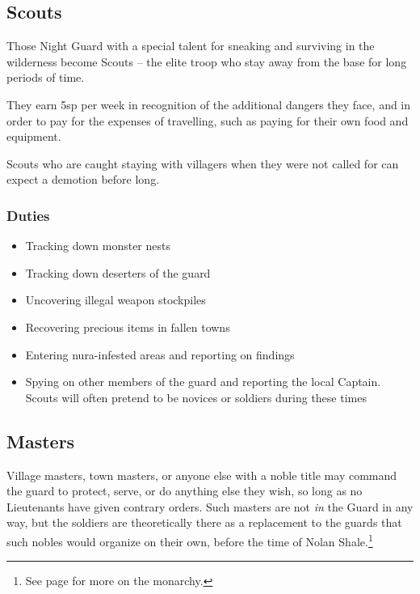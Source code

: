 \begin{multicols}{2}
\subsection{Scouts}

Those Night Guard with a special talent for sneaking and surviving in the wilderness become Scouts -- the elite troop who stay away from the base for long periods of time.

They earn 5sp per week in recognition of the additional dangers they face, and in order to pay for the expenses of travelling, such as paying for their own food and equipment.

Scouts who are caught staying with villagers when they were not called for can expect a demotion before long.

\subsubsection{Duties}

\begin{itemize}

  \item{Tracking down monster nests}
  \item{Tracking down deserters of the \gls{guard}}
  \item{Uncovering illegal weapon stockpiles}
  \item{Recovering precious items in fallen towns}
  \item{Entering nura-infested areas and reporting on findings}
  \item{Spying on other members of the \gls{guard} and reporting the local Captain.
  Scouts will often pretend to be novices or soldiers during these times}

\end{itemize}

\subsection{Masters}

Village masters, town masters, or anyone else with a noble title may command the \gls{guard} to protect, serve, or do anything else they wish, so long as no Lieutenants have given contrary orders.
Such masters are not \textit{in} the Guard in any way, but the soldiers are theoretically there as a replacement to the guards that such nobles would organize on their own, before the time of Nolan Shale.\footnote{See page \pageref{nolan} for more on the monarchy.}


\end{multicols}
